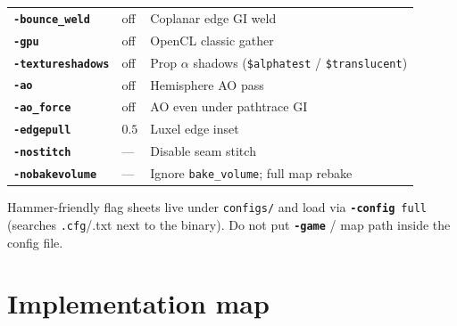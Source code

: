 \documentclass[11pt,a4paper]{article}
\newcommand{\flag}[1]{\texttt{\bfseries #1}}
\newcommand{\vmt}[1]{\texttt{\$#1}}
\begin{document}
\begin{center}
\begin{tabular}{@{}llp{5.8cm}@{}}
  \flag{-bounce\_weld} & off & Coplanar edge GI weld \\
  \flag{-gpu} & off & OpenCL classic gather \\
  \flag{-textureshadows} & off & Prop $\alpha$ shadows (\vmt{alphatest} / \vmt{translucent}) \\
  \flag{-ao} & off & Hemisphere AO pass \\
  \flag{-ao\_force} & off & AO even under pathtrace GI \\
  \flag{-edgepull} & $0.5$ & Luxel edge inset \\
  \flag{-nostitch} & --- & Disable seam stitch \\
  \flag{-nobakevolume} & --- & Ignore \texttt{bake\_volume}; full map rebake \\
  \bottomrule
\end{tabular}
\end{center}

\begin{notebox}
  Hammer-friendly flag sheets live under \texttt{configs/} and load via
  \flag{-config}~\texttt{full} (searches \texttt{.cfg}/.txt next to the binary).
  Do not put \flag{-game} / map path inside the config file.
\end{notebox}

\section{Implementation map}
\label{sec:files}
\end{document}
